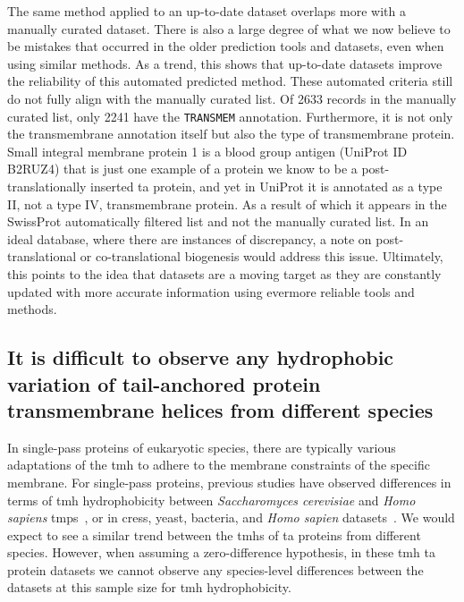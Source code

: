 The same method applied to an up-to-date dataset overlaps more with a manually curated dataset.
There is also a large degree of what we now believe to be mistakes that occurred in the older prediction tools and datasets, even when using similar methods.
As a trend, this shows that up-to-date datasets improve the reliability of this automated predicted method.
These automated criteria still do not fully align with the manually curated list.
Of 2633 records in the manually curated list, only 2241 have the \texttt{TRANSMEM} annotation.
Furthermore, it is not only the transmembrane annotation itself but also the type of transmembrane protein.
Small integral membrane protein 1 is a blood group antigen (UniProt ID B2RUZ4) that is just one example of a protein we know to be a post\--translationally inserted \gls{ta} protein, and yet in  UniProt it is annotated as a type II, not a type IV, transmembrane protein.
As a result of which it appears in the SwissProt automatically filtered list and not the manually curated list.
In an ideal database, where there are instances of discrepancy, a note on post\--translational or co-translational biogenesis would address this issue.
Ultimately, this points to the idea that datasets are a moving target as they are constantly updated with more accurate information using evermore reliable tools and methods.



\subsection{It is difficult to observe any hydrophobic variation of tail\--anchored protein transmembrane helices from different species}

In single\--pass proteins of eukaryotic species, there are typically various adaptations of the \gls{tmh} to adhere to the membrane constraints of the specific membrane.
For single\--pass proteins, previous studies have observed differences in terms of \gls{tmh} hydrophobicity between \textit{Saccharomyces cerevisiae} and \textit{Homo sapiens} \gls{tmp}s~\cite{Sharpe2010}, or in cress, yeast, bacteria, and \textit{Homo sapien} datasets~\cite{Baker2017}.
We would expect to see a similar trend between the \gls{tmh}s of \gls{ta} proteins from different species.
However, when assuming a zero-difference hypothesis, in these \gls{tmh} \gls{ta} protein datasets we cannot observe any species-level differences between the datasets at this sample size for \gls{tmh} hydrophobicity.


